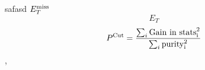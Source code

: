 \documentclass{article}
\begin{document}
safasd
$E_T^{\rm miss}$
\[E_T\]
\[P^{\rm{Cut}} = \frac{\sum_i{\rm{Gain\ in\ stats}^2_i}}{\sum_i{\rm{purity}^2_i }} \],
\end{document}

